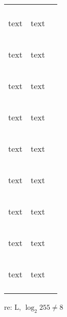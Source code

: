 \documentclass[fleqn,a4paper,11pt]{article}
\begin{document}
\begin{center}
\begin{longtable}{ccc}
\begin{tabular}{cc}
    {\tiny text} \\ %
    \begin{scriptsize}text\end{scriptsize} &
    {\scriptsize text} \\ %
    \begin{footnotesize}text\end{footnotesize} &
    {\footnotesize text} \\ %
    \begin{small}text\end{small} &
    {\small text} \\
    \begin{normalsize}text\end{normalsize} &
    {\normalsize text} \\ %
    \begin{large}text\end{large} &
    {\large text} \\
    \begin{Large}text\end{Large} &
    {\Large text} \\
    \begin{LARGE}text\end{LARGE} &
    {\LARGE text} \\
    \begin{huge}text\end{huge} &
    {\huge text} \\
    \begin{Huge}text\end{Huge} &
    {\Huge text} \\
    \end{tabular} \\
    \end{longtable}
    \end{center}

    re: L, \(\log_2 255 \ne 8\)

%
%
%
\end{document}
